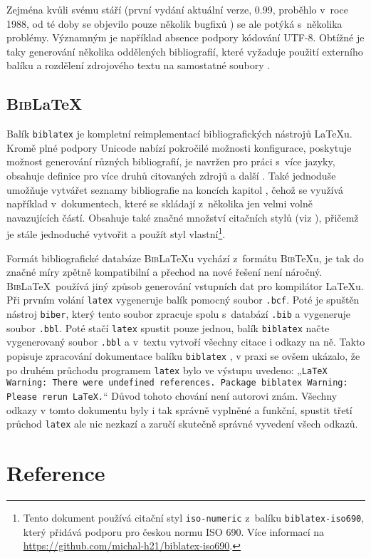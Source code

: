 \documentclass[11pt]{article}
\begin{document}
Zejména kvůli svému stáří (první vydání aktuální verze, 0.99, proběhlo v~roce 1988, od té doby se objevilo pouze několik bugfixů \cite{patashnik_bibtex}) se ale potýká s~několika problémy. Významným je například absence podpory kódování UTF-8. Obtížné je taky generování několika oddělených bibliografií, které vyžaduje použití externího balíku a rozdělení zdrojového textu na samostatné soubory \cite{datta_latex}.

\subsection{\textsc{Bib}\LaTeX}
Balík \verb|biblatex| je kompletní reimplementací bibliografických nástrojů \LaTeX u. Kromě plné podpory Unicode nabízí pokročilé možnosti konfigurace, poskytuje možnost generování různých bibliografií, je navržen pro práci s~více jazyky, obsahuje definice pro více druhů citovaných zdrojů a další \cite[kap.~1]{kime_biblatex}. Také jednoduše umožňuje vytvářet seznamy bibliografie na koncích kapitol \cite[kap.~1.7.3]{dongen_latex}, čehož se využívá například v~dokumentech, které se skládají z~několika jen velmi volně navazujících částí. Obsahuje také značné množství citačních stylů (viz \cite[kap.~3.3]{kime_biblatex}), přičemž je stále jednoduché vytvořit a použít styl vlastní\footnote{Tento dokument používá citační styl \texttt{iso-numeric} z~balíku \texttt{biblatex-iso690}, který přidává podporu pro českou normu ISO 690. Více informací na \url{https://github.com/michal-h21/biblatex-iso690}.}.

Formát bibliografické databáze \textsc{Bib}\LaTeX u vychází z~formátu \textsc{Bib}\TeX u, je tak do značné míry zpětně kompatibilní a přechod na nové řešení není náročný. \textsc{Bib}\LaTeX\ používá jiný způsob generování vstupních dat pro kompilátor \LaTeX u. Při prvním volání \verb|latex| vygeneruje balík pomocný soubor \verb|.bcf|. Poté je spuštěn nástroj \verb|biber|, který tento soubor zpracuje spolu s~databází \verb|.bib| a vygeneruje soubor \verb|.bbl|. Poté stačí \verb|latex| spustit pouze jednou, balík \verb|biblatex| načte vygenerovaný soubor \verb|.bbl| a v~textu vytvoří všechny citace i odkazy na ně. Takto popisuje zpracování dokumentace balíku \verb|biblatex| \cite[kap.~3.13.1]{kime_biblatex}, v praxi se ovšem ukázalo, že po druhém průchodu programem \verb|latex| bylo ve výstupu uvedeno: „\texttt{LaTeX Warning: There were undefined references. Package biblatex Warning: Please rerun LaTeX.}“ Důvod tohoto chování není autorovi znám. Všechny odkazy v tomto dokumentu byly i tak správně vyplněné a funkční, spustit třetí průchod \verb|latex| ale nic nezkazí a zaručí skutečně správné vyvedení všech odkazů.

\clearpage
\section*{Reference}
\printbibliography[heading=none]
\end{document}
